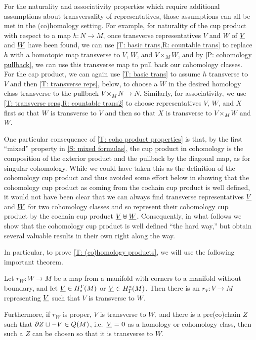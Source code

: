\begin{remark}
	For the naturality and associativity properties which require additional assumptions about transversality of representatives, those assumptions can all be met in the (co)homology setting.
	For example, for naturality of the cup product with respect to a map $h \colon N \to M$, once transverse representatives $V$ and $W$ of $\underline{V}$ and $\underline{W}$ have been found, we can use \cref{T: basic trans,R: countable trans} to replace $h$ with a homotopic map transverse to $V$, $W$, and $V \times_M W$, and by \cref{P: cohomology pullback}, we can use this transverse map to pull back our cohomology classes.
	For the cap product, we can again use \cref{T: basic trans} to assume $h$ transverse to $V$ and then \cref{T: transverse reps}, below, to choose a $W$ in the desired homology class transverse to the pullback $V \times_M N \to N$.
	Similarly, for associativity, we use \cref{T: transverse reps,R: countable trans2} to choose representatives $V$, $W$, and $X$ first so that $W$ is transverse to $V$ and then so that $X$ is transverse to $V \times_M W$ and $W$.
\end{remark}


One particular consequence of \cref{T: coho product properties} is that, by the first ``mixed'' property in \cref{S: mixed formulas}, the cup product in cohomology is the composition of the exterior product and the pullback by the diagonal map, as for singular cohomology.
While we could have taken this as the definition of the cohomology cup product and thus avoided some effort below in showing that the cohomology cup product as coming from the cochain cup product is well defined, it would not have been clear that we can always find transverse representatives $\underline{V}$ and $\underline{W}$ for two cohomology classes and so represent their cohomology cup product by the cochain cup product $\underline{V} \uplus \underline{W}$.
Consequently, in what follows we show that the cohomology cup product is well defined ``the hard way,'' but obtain several valuable results in their own right along the way.

In particular, to prove \cref{T: (co)homology products}, we will use the following important theorem.

\begin{theorem}\label{T: transverse reps}
Let $r_W \colon W \to M$ be a map from a manifold with corners to a manifold without boundary, and let $\underline{V} \in H_*^\Gamma(M)$ or $\underline{V} \in H^*_\Gamma(M)$.
Then there is an $r_V \colon V \to M$ representing $\underline{V}$ such that $V$ is transverse to $W$.

Furthermore, if $r_W$ is proper, $V$ is transverse to $W$, and there is a pre(co)chain $Z$ such that $\partial Z \sqcup -V \in Q(M)$, i.e.\ $\underline{V} = 0$ as a homology or cohomology class, then such a $Z$ can be chosen so that it is transverse to $W$.
\end{theorem}

